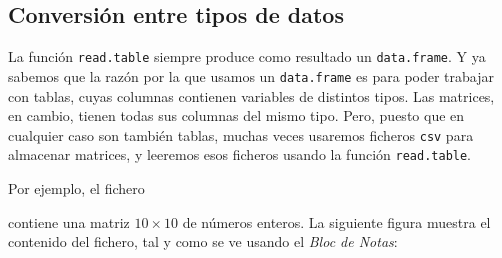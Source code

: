 \documentclass[10pt,a4paper]{article}\usepackage[]{graphicx}\usepackage[]{color}
\newcounter {cont01}
\begin{document}
\subsection{Conversión entre tipos de datos}
\label{tut04:subsec:ConversionTiposDatos}

La función {\tt read.table} siempre produce como resultado un {\tt data.frame}. Y ya sabemos que la razón por la que usamos un {\tt data.frame} es para poder trabajar con tablas, cuyas columnas contienen variables de distintos tipos. Las matrices, en cambio, tienen todas sus columnas del mismo tipo. Pero, puesto que en cualquier caso son también tablas, muchas veces usaremos ficheros {\tt csv} para almacenar matrices, y leeremos esos ficheros usando la función {\tt read.table}.

Por ejemplo, el fichero
\begin{center}
\end{center}
contiene una matriz $10\times 10$ de números enteros. La siguiente figura muestra el contenido del fichero, tal y como se ve usando el {\em Bloc de Notas}:
\end{document}

